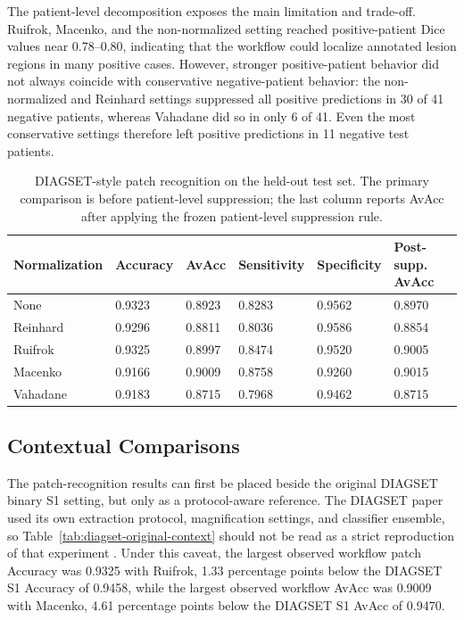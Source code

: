 \documentclass[a4paper,fleqn]{cas-dc}
\begin{document}
The patient-level decomposition exposes the main limitation and trade-off. Ruifrok, Macenko, and the non-normalized setting reached positive-patient Dice values near 0.78--0.80, indicating that the workflow could localize annotated lesion regions in many positive cases. However, stronger positive-patient behavior did not always coincide with conservative negative-patient behavior: the non-normalized and Reinhard settings suppressed all positive predictions in 30 of 41 negative patients, whereas Vahadane did so in only 6 of 41. Even the most conservative settings therefore left positive predictions in 11 negative test patients.

\begin{table}[t]
\caption{DIAGSET-style patch recognition on the held-out test set. The primary comparison is before patient-level suppression; the last column reports AvAcc after applying the frozen patient-level suppression rule.}
\label{tab:patch-results}
\centering
\fontsize{7.6}{8.6}\selectfont
\setlength{\tabcolsep}{4pt}
\begin{tabular}{P{2.6cm}P{1.6cm}P{1.6cm}P{1.6cm}P{1.6cm}P{2.1cm}}
\toprule
Normalization & Accuracy & AvAcc & Sensitivity & Specificity & Post-supp. AvAcc \\
\midrule
None & 0.9323 & 0.8923 & 0.8283 & 0.9562 & 0.8970 \\
Reinhard & 0.9296 & 0.8811 & 0.8036 & 0.9586 & 0.8854 \\
Ruifrok & 0.9325 & 0.8997 & 0.8474 & 0.9520 & 0.9005 \\
Macenko & 0.9166 & 0.9009 & 0.8758 & 0.9260 & 0.9015 \\
Vahadane & 0.9183 & 0.8715 & 0.7968 & 0.9462 & 0.8715 \\
\bottomrule
\end{tabular}
\end{table}

\subsection{Contextual Comparisons}

The patch-recognition results can first be placed beside the original DIAGSET binary S1 setting, but only as a protocol-aware reference. The DIAGSET paper used its own extraction protocol, magnification settings, and classifier ensemble, so Table~\ref{tab:diagset-original-context} should not be read as a strict reproduction of that experiment \cite{koziarski2024diagset}. Under this caveat, the largest observed workflow patch Accuracy was 0.9325 with Ruifrok, 1.33 percentage points below the DIAGSET S1 Accuracy of 0.9458, while the largest observed workflow AvAcc was 0.9009 with Macenko, 4.61 percentage points below the DIAGSET S1 AvAcc of 0.9470.
\end{document}
